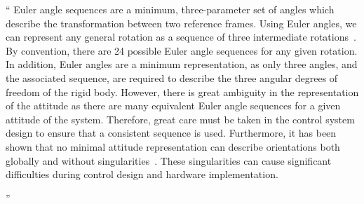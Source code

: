 \documentclass[11pt]{article}
\newenvironment{correction}{\begin{list}{}{\setlength{\leftmargin}{1cm}\setlength{\rightmargin}{1cm}}\vspace{\parsep}\item[]``}{''\end{list}}
\begin{document}
\begin{enumerate}
\begin{correction}
Euler angle sequences are a minimum, three-parameter set of angles which describe the transformation between two reference frames.
Using Euler angles, we can represent any general rotation as a sequence of three intermediate rotations~\cite{shuster1993}.
By convention, there are \num{24} possible Euler angle sequences for any given rotation.
In addition, Euler angles are a minimum representation, as only three angles, and the associated sequence, are required to describe the three angular degrees of freedom of the rigid body.
However, there is great ambiguity in the representation of the attitude as there are many equivalent Euler angle sequences for a given attitude of the system.
Therefore, great care must be taken in the control system design to ensure that a consistent sequence is used. 
Furthermore, it has been shown that no minimal attitude representation can describe orientations both globally and without singularities~\cite{hughes2004,bhat2000}.
These singularities can cause significant difficulties during control design and hardware implementation.


\end{correction}
\end{enumerate}
\end{document}
